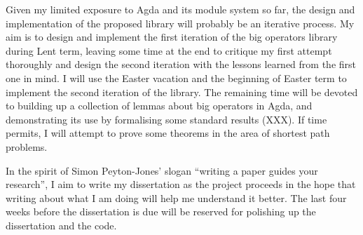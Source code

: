 \documentclass[a4paper]{scrartcl}
\begin{document}
Given my limited exposure to Agda and its module system so far, the design and implementation of the proposed library will probably be an iterative process. My aim is to design and implement the first iteration of the big operators library during Lent term, leaving some time at the end to critique my first attempt thoroughly and design the second iteration with the lessons learned from the first one in mind. I will use the Easter vacation and the beginning of Easter term to implement the second iteration of the library. The remaining time will be devoted to building up a collection of lemmas about big operators in Agda, and demonstrating its use by formalising some standard results (XXX). If time permits, I will attempt to prove some theorems in the area of shortest path problems.

In the spirit of Simon Peyton-Jones' slogan \enquote{writing a paper guides your research}, I aim to write my dissertation as the project proceeds in the hope that writing about what I am doing will help me understand it better. The last four weeks before the dissertation is due will be reserved for polishing up the dissertation and the code.
\end{document}
